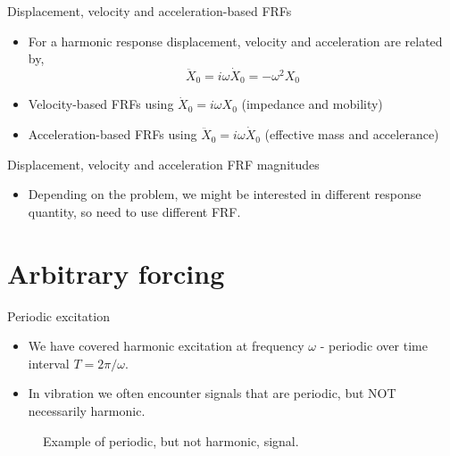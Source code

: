 \documentclass[11pt,aspectratio=169,handout]{beamer}
\begin{document}
\begin{frame}[c]{Displacement, velocity and acceleration-based FRFs}
	\begin{itemize}
		\item<1-> For a harmonic response displacement, velocity and acceleration are related by,
		\begin{equation}
			\ddot{X}_0 = i\omega \dot{X}_0 = -\omega^2 X_0
		\end{equation}
		\item<2-> Velocity-based FRFs using $ \dot{X}_0 = i\omega X_0$ (impedance and mobility)
	\end{itemize}
	\begin{itemize}
	\item<3-> Acceleration-based FRFs using $ \ddot{X}_0 = i\omega \dot{X}_0$ (effective mass and accelerance)
\end{itemize}
\end{frame}

\begin{frame}[c]{Displacement, velocity and acceleration FRF magnitudes}
	\begin{itemize}
		\item<1-> Depending on the problem, we might be interested in different response quantity, so need to use different FRF.
	\end{itemize}
	\begin{figure}
		
	\end{figure}
\end{frame}


\section{Arbitrary forcing}
\begin{frame}[c]{Periodic excitation}
	\begin{itemize}
		\item<1-> We have covered harmonic excitation at frequency $\omega$ - periodic over time interval $T=2\pi/\omega$.
		\item<2-> In vibration we often encounter signals that are periodic, but NOT necessarily harmonic.
	\end{itemize}
	\begin{figure}
	
	\caption{Example of periodic, but not harmonic, signal.}
\end{figure}
\end{frame}
\end{document}
